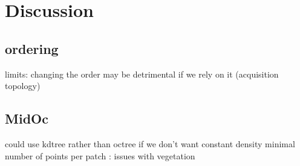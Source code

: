 

 \section{ \label{sec:discussion} Discussion}
 
 \subsection{ordering}
 	limits: changing the order may be detrimental if we rely on it (acquisition topology)
 	
 \subsection{MidOc}
 	could use kdtree rather than octree if we don't want constant density
  	minimal number of points per patch : issues with vegetation
  	